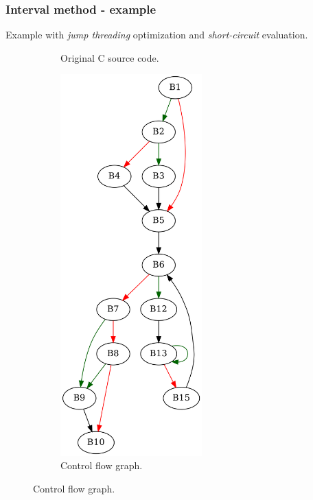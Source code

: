 

\clearpage

\subsubsection{Interval method - example}

Example with \textit{jump threading} optimization and \textit{short-circuit} evaluation.

\begin{figure}[htbp]
	\centering
	\begin{subfigure}[b]{0.30\textwidth}
		\centering
		
		\caption{Original C source code.}
	\end{subfigure}
	\begin{subfigure}[b]{0.50\textwidth}
		\centering
		\includegraphics[width=0.6\textwidth]{inc/appendices/examples/interval/example/sample/f.png}
		\caption{Control flow graph.}
	\end{subfigure}
\end{figure}

